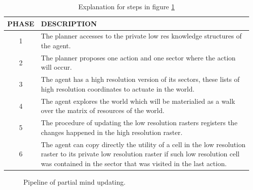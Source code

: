 \documentclass[11pt,oneside,a4paper,openright]{report}
\begin{document}
	\begin{table}[ht!]
	\centering
	\begin{tabular}{|c|p{7cm}|}
		\hline
		PHASE	&	DESCRIPTION\\
		\hline
		1	&	The planner accesses to the private low res knowledge structures of the agent.\\
		\hline
		2	&	The planner proposes one action and one sector where the action will occur.\\
		\hline
		3	&	The agent has a high resolution version of its sectors, these lists of high resolution coordinates to actuate in the world.\\
		\hline
		4	&	The agent explores the world which will be materialied as a walk over the matrix of resources of the world.\\
		\hline
		5	&	The procedure of updating the low resolution rasters registers the changes happened in the high resolution raster.\\
		\hline
		6	&	The agent can copy directly the utility of a cell in the low resolution raster to its private low resolution raster if such low resolution cell was contained in the sector that was visited in the last action.\\
		\hline
	\end{tabular}
	\caption{Explanation for steps in figure \ref{fig:PartMind}}
	\label{tab:explainStepsPartMindUpdate}
	\end{table}

\begin{figure}[h!]
\centering
\setlength\fboxsep{0pt}
\setlength\fboxrule{0.5pt}
\caption{Pipeline of partial mind updating.}
\label{fig:PartMind}
\end{figure}
\end{document}
